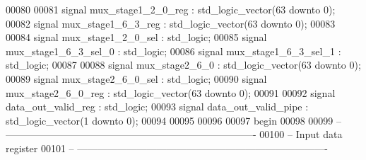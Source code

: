 \begin{DoxyCode}
00080 
00081 \textcolor{keywordflow}{signal} \textcolor{vhdlchar}{mux_stage1_2_0_reg}     \textcolor{vhdlchar}{:} \textcolor{comment}{std\_logic\_vector}\textcolor{vhdlchar}{(}\textcolor{vhdllogic}{}\textcolor{vhdllogic}{63} \textcolor{keywordflow}{downto} \textcolor{vhdllogic}{}\textcolor{vhdllogic}{0}\textcolor{vhdlchar}{)};
00082 \textcolor{keywordflow}{signal} \textcolor{vhdlchar}{mux_stage1_6_3_reg}     \textcolor{vhdlchar}{:} \textcolor{comment}{std\_logic\_vector}\textcolor{vhdlchar}{(}\textcolor{vhdllogic}{}\textcolor{vhdllogic}{63} \textcolor{keywordflow}{downto} \textcolor{vhdllogic}{}\textcolor{vhdllogic}{0}\textcolor{vhdlchar}{)};
00083 
00084 \textcolor{keywordflow}{signal} \textcolor{vhdlchar}{mux_stage1_2_0_sel}     \textcolor{vhdlchar}{:} \textcolor{comment}{std\_logic};
00085 \textcolor{keywordflow}{signal} \textcolor{vhdlchar}{mux_stage1_6_3_sel_0}   \textcolor{vhdlchar}{:} \textcolor{comment}{std\_logic};
00086 \textcolor{keywordflow}{signal} \textcolor{vhdlchar}{mux_stage1_6_3_sel_1}   \textcolor{vhdlchar}{:} \textcolor{comment}{std\_logic};
00087 
00088 \textcolor{keywordflow}{signal} \textcolor{vhdlchar}{mux_stage2_6_0}         \textcolor{vhdlchar}{:} \textcolor{comment}{std\_logic\_vector}\textcolor{vhdlchar}{(}\textcolor{vhdllogic}{}\textcolor{vhdllogic}{63} \textcolor{keywordflow}{downto} \textcolor{vhdllogic}{}\textcolor{vhdllogic}{0}\textcolor{vhdlchar}{)};
00089 \textcolor{keywordflow}{signal} \textcolor{vhdlchar}{mux_stage2_6_0_sel}     \textcolor{vhdlchar}{:} \textcolor{comment}{std\_logic};
00090 \textcolor{keywordflow}{signal} \textcolor{vhdlchar}{mux_stage2_6_0_reg}     \textcolor{vhdlchar}{:} \textcolor{comment}{std\_logic\_vector}\textcolor{vhdlchar}{(}\textcolor{vhdllogic}{}\textcolor{vhdllogic}{63} \textcolor{keywordflow}{downto} \textcolor{vhdllogic}{}\textcolor{vhdllogic}{0}\textcolor{vhdlchar}{)};
00091 
00092 \textcolor{keywordflow}{signal} \textcolor{vhdlchar}{data_out_valid_reg}     \textcolor{vhdlchar}{:} \textcolor{comment}{std\_logic};
00093 \textcolor{keywordflow}{signal} \textcolor{vhdlchar}{data_out_valid_pipe}    \textcolor{vhdlchar}{:} \textcolor{comment}{std\_logic\_vector}\textcolor{vhdlchar}{(}\textcolor{vhdllogic}{}\textcolor{vhdllogic}{1} \textcolor{keywordflow}{downto} \textcolor{vhdllogic}{}\textcolor{vhdllogic}{0}\textcolor{vhdlchar}{)};
00094 
00095 
00096  
00097 \textcolor{vhdlkeyword}{begin}
00098 
00099 \textcolor{keyword}{-- ----------------------------------------------------------------------------}
00100 \textcolor{keyword}{-- Input data register}
00101 \textcolor{keyword}{-- ----------------------------------------------------------------------------}

\end{DoxyCode}
